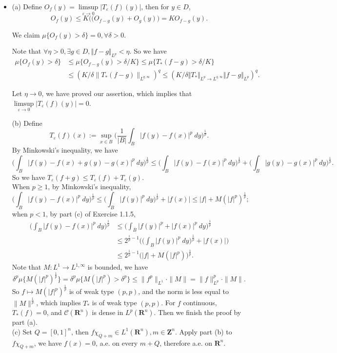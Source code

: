 \begin{itemize}
\item[2.1.10]

(a)
Define $O_f(y)=\limsup\limits_{\varepsilon\rightarrow0}\vert T_{\varepsilon}(f)(y)\vert $,
then for $y \in D$,
$$O_f(y)\leq K\big((O_{f-g}(y)+O_g(y)\big)=KO_{f-g}(y).$$

We claim $\mu \{O_f(y)>\delta\}=0,\forall \delta>0.$

Note that $\forall \eta>0, \exists g\in D,\Vert f-g\Vert _{L^p}<\eta.$
So we have 
\begin{align*}
\mu\{O_f(y)>\delta\}
&\leq \mu\{O_{f-g}(y)>\delta/K\} \leq \mu\{T_*(f-g)>\delta/K\}\\
&\leq (K/\delta\|T_*(f-g)\|_{L^{q,\infty}})^q
\leq (K/\delta\Vert T_*\Vert_{L^p\rightarrow L^{q,\infty}}\Vert f-g\Vert _{L^p})^q.
\end{align*}

Let $\eta \rightarrow 0 $, we have proved our assertion, which implies that 
$\limsup\limits_{\varepsilon\rightarrow0}\vert T_\varepsilon(f)(y)\vert =0$.

(b) Define $$T_\varepsilon(f)(x):=\sup\limits_{x\in B}\bigg(\frac1{\vert B\vert}\int_B\vert f(y)-f(x)\vert ^p\>dy\bigg)^{\frac1p}.$$
By Minkowski's inequality, we have 
$$\bigg(\int_B|f(y)-f(x)+g(y)-g(x)|^p\>dy\bigg)^{\frac1p}\leq 
\bigg(\int_B|f(y)-f(x)|^p\>dy\bigg)^{\frac1p}+\bigg(\int_B|g(y)-g(x)|^p\>dy\bigg)^{\frac1p}.$$
So we have $T_\varepsilon(f+g)\leq T_\varepsilon(f)+T_\varepsilon(g).$\\
When $p\geq 1$, by Minkowski's inequality, 
$$\bigg(\int_B|f(y)-f(x)|^p\>dy\bigg)^{\frac1p}
\leq \bigg(\int_B|f(y)|^p\>dy\bigg)^{\frac1p}+|f(x)|
\leq |f|+M(|f|^p)^{\frac1p};$$
when $p<1$, by part (c) of Exercise 1.1.5, 
\begin{align*}
\bigg(\int_B|f(y)-f(x)|^p\>dy\bigg)^{\frac1p}
&\leq \bigg(\int_B|f(y)|^p +|f(x)|^p\>dy\bigg)^{\frac1p}\\
&\leq 2^{\frac1p-1}\bigg(\bigg(\int_B|f(y)|^p\>dy\bigg)^{\frac1p}+|f(x)|\bigg)\\
&\leq 2^{\frac1p-1}\big(|f|+M(|f|^p)\big)^{\frac1p}.
\end{align*}
Note that $M:L^1\rightarrow L^{1,\infty} $ is bounded, we have 
$$\delta^p\mu\{M(|f|^p)^{\frac1p}\}
=\delta ^p\mu\{M(|f|^p)>\delta^p\}\leq \|f^p\|_{L^1}\cdot \|M\| 
=\|f\|^p_{L^p}\cdot \|M\|.$$
So $f\mapsto M(|f|^p)^{\frac1p}$ is of weak type $(p,p)$, 
and the norm is less equal to $\|M\|^{\frac1p}$, 
which implies $T_*$ is of weak type $(p,p)$. 
For $f$ continuous, $T_*(f)=0$, 
and $\mathscr{C}(\mathbf{R}^n) $ is dense in $L^p(\mathbf{R}^n)$. 
Then we finish the proof by part (a).\\
(c) Set $Q=[0,1]^n$, then $f\chi_{Q+m}\in L^1(\mathbf{R}^n),m\in \mathbf{Z}^n$. 
Apply part (b) to $f\chi_{Q+m}$, we have $f(x)=0$, a.e. on every $m+Q$, 
therefore a.e. on $\mathbf{R}^n$.



\end{itemize}
